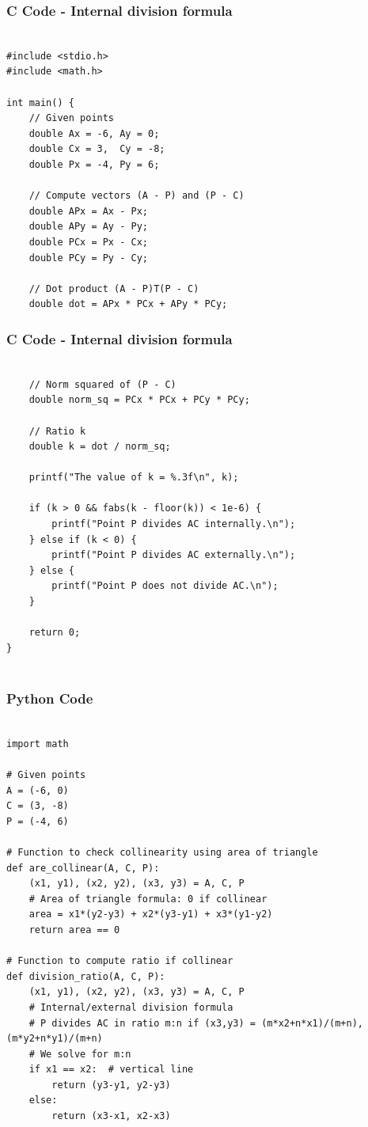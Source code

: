 \documentclass{beamer}
\begin{document}
\begin{frame}[fragile]
    \frametitle{C Code - Internal division formula}

    \begin{lstlisting}

#include <stdio.h>
#include <math.h>

int main() {
    // Given points
    double Ax = -6, Ay = 0;
    double Cx = 3,  Cy = -8;
    double Px = -4, Py = 6;

    // Compute vectors (A - P) and (P - C)
    double APx = Ax - Px;
    double APy = Ay - Py;
    double PCx = Px - Cx;
    double PCy = Py - Cy;

    // Dot product (A - P)T(P - C)
    double dot = APx * PCx + APy * PCy;

    \end{lstlisting}
\end{frame}

\begin{frame}[fragile]
    \frametitle{C Code - Internal division formula}

    \begin{lstlisting}

    // Norm squared of (P - C)
    double norm_sq = PCx * PCx + PCy * PCy;

    // Ratio k
    double k = dot / norm_sq;

    printf("The value of k = %.3f\n", k);

    if (k > 0 && fabs(k - floor(k)) < 1e-6) {
        printf("Point P divides AC internally.\n");
    } else if (k < 0) {
        printf("Point P divides AC externally.\n");
    } else {
        printf("Point P does not divide AC.\n");
    }

    return 0;
}


    \end{lstlisting}
\end{frame}

\begin{frame}[fragile]
     \frametitle{Python Code}
     \begin{lstlisting}
         
import math

# Given points
A = (-6, 0)
C = (3, -8)
P = (-4, 6)

# Function to check collinearity using area of triangle
def are_collinear(A, C, P):
    (x1, y1), (x2, y2), (x3, y3) = A, C, P
    # Area of triangle formula: 0 if collinear
    area = x1*(y2-y3) + x2*(y3-y1) + x3*(y1-y2)
    return area == 0

# Function to compute ratio if collinear
def division_ratio(A, C, P):
    (x1, y1), (x2, y2), (x3, y3) = A, C, P
    # Internal/external division formula
    # P divides AC in ratio m:n if (x3,y3) = (m*x2+n*x1)/(m+n), (m*y2+n*y1)/(m+n)
    # We solve for m:n
    if x1 == x2:  # vertical line
        return (y3-y1, y2-y3)
    else:
        return (x3-x1, x2-x3)
        
\end{lstlisting}
\end{frame}
\end{document}
